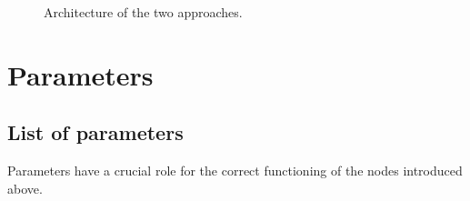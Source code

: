 \documentclass[11pt,a4paper]{article}
\begin{document}
\begin{figure}[H]
    \centering
    \quad
    \caption[]{Architecture of the two approaches.}
\end{figure}





\section{Parameters}



\subsection{List of parameters}

Parameters have a crucial role for the correct functioning of the nodes introduced above.\\
\end{document}
